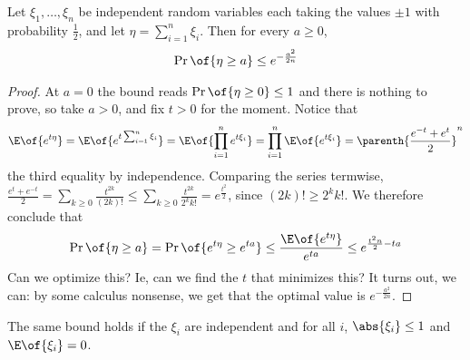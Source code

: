 \begin{boxtheorem} \label{Ch3:Thm:Chernoff}
    Let $\xi_1, \ldots, \xi_n$ be independent random variables each taking the values $\pm 1$ with probability $\frac{1}{2}$, and let $\eta = \sum_{i=1}^{n} \xi_i$. Then for every $a \geq 0$,
    \begin{align*}
        \Pr\of{\eta \geq a} \leq e^{-\frac{a^2}{2n}}
    \end{align*}
\end{boxtheorem}
\begin{proof}
    At $a = 0$ the bound reads $\Pr\of{\eta \geq 0} \leq 1$ and there is nothing to prove, so take $a > 0$, and fix $t > 0$ for the moment. Notice that
    \begin{align*}
        \E\of{e^{t \eta}}
        = \E\of{e^{t \sum_{i=1}^{n} \xi_i}}
        = \E\of{\prod_{i=1}^{n} e^{t \xi_i}}
        = \prod_{i=1}^{n} \E\of{e^{t \xi_i}}
        = \parenth{\frac{e^{-t} + e^{t}}{2}}^{n}
    \end{align*}
    the third equality by independence. Comparing the series termwise, $\frac{e^{t} + e^{-t}}{2} = \sum_{k \geq 0} \frac{t^{2k}}{(2k)!} \leq \sum_{k \geq 0} \frac{t^{2k}}{2^k k!} = e^{\frac{t^2}{2}}$, since $(2k)! \geq 2^k k!$. We therefore conclude that
    \begin{align*}
        \Pr\of{\eta \geq a}
        = \Pr\of{e^{t\eta} \geq e^{ta}}
        \leq \frac{\E\of{e^{t \eta}}}{e^{ta}}
        \leq e^{\frac{t^2 n}{2} - ta}
    \end{align*}
    Can we optimize this? Ie, can we find the $t$ that minimizes this? It turns out, we can: by some calculus nonsense, we get that the optimal value is $e^{-\frac{a^2}{2n}}$.
\end{proof}

The same bound holds if the $\xi_i$ are independent and for all $i$, $\abs{\xi_i} \leq 1$ and $\E\of{\xi_i} = 0$.

